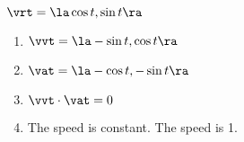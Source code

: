 {$\vrt = \la \cos t,\sin t\ra$
}
{\begin{enumerate}
\item $\vvt = \la -\sin t, \cos t\ra$
\item $\vat = \la -\cos t, -\sin t \ra$
\item $\vvt \cdot \vat = 0$
\item The speed is constant.  The speed is 1.
\end{enumerate}
}

